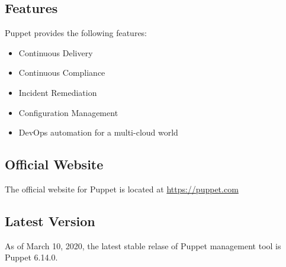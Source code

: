 \documentclass[a4paper, 12pt]{article}
\begin{document}
\subsection{Features}
Puppet provides the following features:
\begin{itemize}
\item
Continuous Delivery
\item
Continuous Compliance
\item
Incident Remediation
\item
Configuration Management
\item
DevOps automation for a multi-cloud world
\end{itemize}

\subsection{Official Website}
The official website for Puppet is located at \href{https://puppet.com}{https://puppet.com}

\subsection{Latest Version}
As of March 10, 2020, the latest stable relase of Puppet management tool is Puppet 6.14.0.
\end{document}
